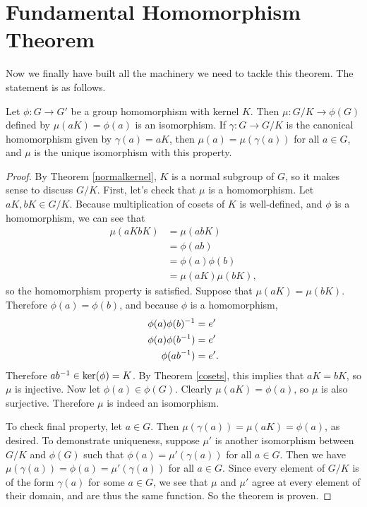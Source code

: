 \section{Fundamental Homomorphism Theorem}

Now we finally have built all the machinery we need to tackle this theorem. The statement is as follows.

\begin{theorem}
Let $\phi: G \to G'$ be a group homomorphism with kernel $K$. Then $\mu: G/K \to \phi(G)$ defined by $\mu(aK) = \phi(a)$ is an isomorphism. If $\gamma: G \to G/K$ is the canonical homomorphism given by $\gamma(a) = aK$, then $\mu(a) = \mu(\gamma(a))$ for all $a \in G$, and $\mu$ is the unique isomorphism with this property.
\end{theorem}

\begin{proof}
By Theorem \ref{normalkernel}, $K$ is a normal subgroup of $G$, so it makes sense to discuss $G/K$. First, let's check that $\mu$ is a homomorphism. Let $aK, bK \in G/K$. Because multiplication of cosets of $K$ is well-defined, and $\phi$ is a homomorphism, we can see that
\begin{align*}
    \mu(aKbK) &= \mu(abK) \\
    &= \phi(ab) \\
    &= \phi(a)\phi(b) \\
    &= \mu(aK)\mu(bK)\mathrm{,}
\end{align*}
so the homomorphism property is satisfied. Suppose that $\mu(aK) = \mu(bK).$ Therefore $\phi(a) = \phi(b)$, and because $\phi$ is a homomorphism,
\begin{align*}
    \phi(a)\phi(b)^{-1} &= e' \\
    \phi(a)\phi(b^{-1}) &= e' \\
    \phi(ab^{-1}) &= e'\mathrm{.}
\end{align*}
Therefore $ab^{-1} \in \ker(\phi) = K$. By Theorem \ref{cosets}, this implies that $aK = bK$, so $\mu$ is injective. Now let $\phi(a) \in \phi(G)$. Clearly $\mu(aK) = \phi(a)$, so $\mu$ is also surjective. Therefore $\mu$ is indeed an isomorphism.

To check final property, let $a \in G$. Then $\mu(\gamma(a)) = \mu(aK) = \phi(a)$, as desired. To demonstrate uniqueness, suppose $\mu'$ is another isomorphism between $G/K$ and $\phi(G)$ such that $\phi(a) = \mu'(\gamma(a))$ for all $a \in G$. Then we have $\mu(\gamma(a)) = \phi(a) = \mu'(\gamma(a))$ for all $a \in G$. Since every element of $G/K$ is of the form $\gamma(a)$ for some $a \in G$, we see that $\mu$ and $\mu'$ agree at every element of their domain, and are thus the same function. So the theorem is proven.

\end{proof}

